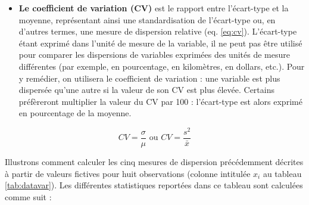\documentclass[
  11pt,
  french,
]{book}
\providecommand{\tightlist}{%
  \setlength{\itemsep}{0pt}\setlength{\parskip}{0pt}}
\begin{document}
\begin{itemize}
\tightlist
\item
  \textbf{Le coefficient de variation (CV)} est le rapport entre l'écart-type et la moyenne, représentant ainsi une standardisation de l'écart-type ou, en d'autres termes, une mesure de dispersion relative (eq. \eqref{eq:cv}). L'écart-type étant exprimé dans l'unité de mesure de la variable, il ne peut pas être utilisé pour comparer les dispersions de variables exprimées des unités de mesure différentes (par exemple, en pourcentage, en kilomètres, en dollars, etc.). Pour y remédier, on utilisera le coefficient de variation : une variable est plus dispersée qu'une autre si la valeur de son CV est plus élevée. Certains préfèreront multiplier la valeur du CV par 100 : l'écart-type est alors exprimé en pourcentage de la moyenne.
\end{itemize}

\begin{equation} 
CV=\frac{\sigma}{\mu} \text{ ou } CV=\frac{s^2}{\bar{x}}
\label{eq:cv}
\end{equation}

Illustrons comment calculer les cinq mesures de dispersion précédemment décrites à partir de valeurs fictives pour huit observations (colonne intitulée \(x_i\) au tableau \ref{tab:datavar}). Les différentes statistiques reportées dans ce tableau sont calculées comme suit :
\end{document}
